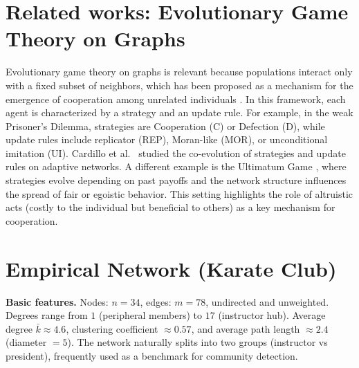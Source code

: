 \section{Related works: Evolutionary Game Theory on Graphs}
Evolutionary game theory on graphs is relevant because populations interact only
with a fixed subset of neighbors, which has been proposed as a mechanism for the
emergence of cooperation among unrelated individuals
\cite{cardillo2010coevolution}.  
In this framework, each agent is characterized by a strategy and an update rule.
For example, in the weak Prisoner’s Dilemma, strategies are Cooperation (C) or
Defection (D), while update rules include replicator (REP), Moran-like (MOR),
or unconditional imitation (UI).  
Cardillo et al.~\cite{cardillo2010coevolution} studied the co-evolution of
strategies and update rules on adaptive networks.  
A different example is the Ultimatum Game \cite{sinatra2009ultimatum}, where
strategies evolve depending on past payoffs and the network structure influences
the spread of fair or egoistic behavior.  
This setting highlights the role of altruistic acts (costly to the individual
but beneficial to others) as a key mechanism for cooperation.

\section{Empirical Network (Karate Club)}

\noindent\textbf{Basic features.}  
Nodes: $n=34$, edges: $m=78$, undirected and unweighted.  
Degrees range from $1$ (peripheral members) to $17$ (instructor hub).  
Average degree $\bar{k}\approx 4.6$, clustering coefficient $\approx 0.57$, and
average path length $\approx 2.4$ (diameter $=5$).  
The network naturally splits into two groups (instructor vs president),
frequently used as a benchmark for community detection. \cite{zachary1977karate}

